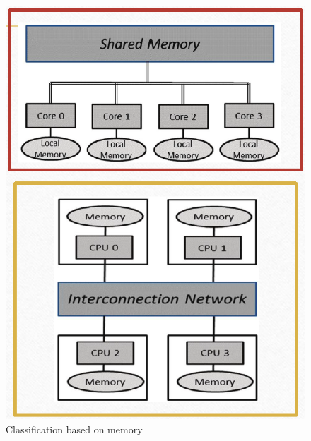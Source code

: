 \begin{paracol}{2}
   \begin{figure}[htbp]
      \centering
      \includegraphics{images/03/mimd2.png}
      \caption{Classification based on memory}  
      \label{fig:03/mimd2}
   \end{figure}

   \switchcolumn


\end{paracol}

